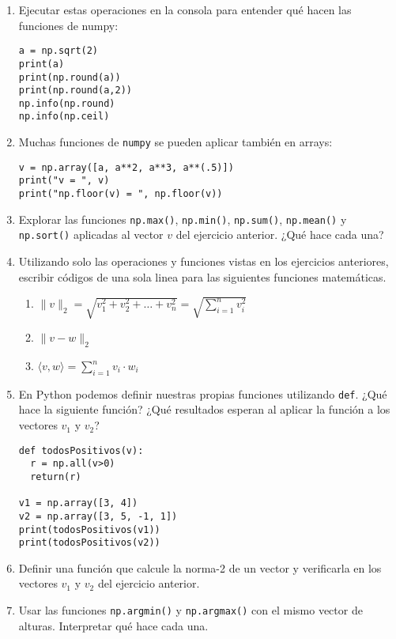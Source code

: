\documentclass[a4paper,11pt]{article}
\theoremstyle{definition}
\begin{document}
\begin{enumerate}[resume]
\item Ejecutar estas operaciones en la consola para entender qué hacen las funciones de numpy:
\begin{lstlisting}
a = np.sqrt(2)
print(a)
print(np.round(a))
print(np.round(a,2))
np.info(np.round)
np.info(np.ceil)
\end{lstlisting}

\item Muchas funciones de \lstinline{numpy} se pueden aplicar también en arrays:
\begin{lstlisting}
v = np.array([a, a**2, a**3, a**(.5)])
print("v = ", v)
print("np.floor(v) = ", np.floor(v))
\end{lstlisting}

\item Explorar las funciones \lstinline{np.max()}, \lstinline{np.min()}, \lstinline{np.sum()}, \lstinline{np.mean()} y \lstinline{np.sort()} aplicadas al vector $v$ del ejercicio anterior. ¿Qué hace cada una?

\item Utilizando solo las operaciones y funciones vistas en los ejercicios anteriores, escribir códigos de una sola linea para las siguientes funciones matemáticas.
\begin{enumerate}
\item $\|v\|_2 = \sqrt{v_1^2 + v_2^2 + \dots + v_n^2} = \sqrt{\sum_{i=1}^n v_i^2}$
\item $\|v - w\|_2$
\item $\langle v, w\rangle = \sum_{i=1}^n v_i \cdot w_i$
\end{enumerate}

\item En Python podemos definir nuestras propias funciones utilizando \lstinline{def}. ¿Qué hace la siguiente función? ¿Qué resultados esperan al aplicar la función a los vectores $v_1$ y $v_2$?
\begin{lstlisting}
def todosPositivos(v):
  r = np.all(v>0)
  return(r)
  
v1 = np.array([3, 4])
v2 = np.array([3, 5, -1, 1])
print(todosPositivos(v1))
print(todosPositivos(v2))
\end{lstlisting}
  
\item Definir una función que calcule la norma-2 de un vector y verificarla en los vectores $v_1$ y $v_2$ del ejercicio anterior.

\item Usar las funciones \lstinline{np.argmin()} y \lstinline{np.argmax()} con el mismo vector de alturas. Interpretar qué hace cada una.


\end{enumerate}
\end{document}

